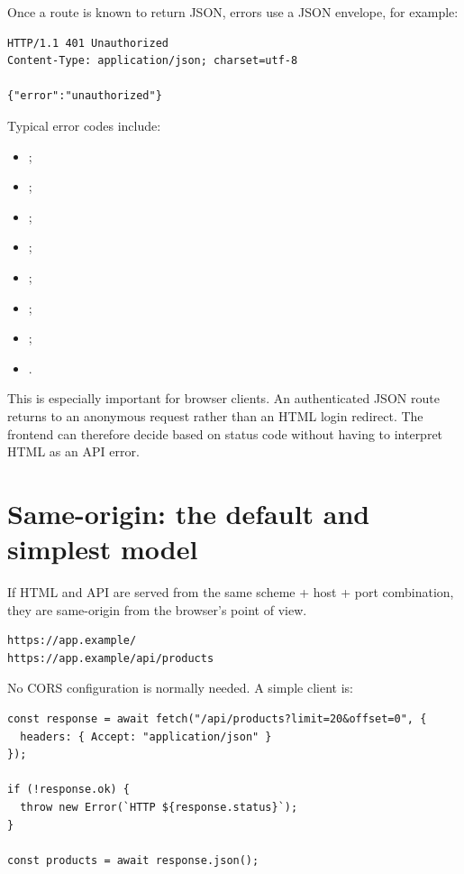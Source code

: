 Once a route is known to return JSON, errors use a JSON envelope, for example:

\begin{lstlisting}
HTTP/1.1 401 Unauthorized
Content-Type: application/json; charset=utf-8

{"error":"unauthorized"}
\end{lstlisting}

Typical error codes include:

\begin{itemize}
  \item {};
  \item {};
  \item {};
  \item {};
  \item {};
  \item {};
  \item {};
  \item {}.
\end{itemize}

This is especially important for browser clients. An authenticated JSON route returns  to an anonymous request rather than an HTML login redirect. The frontend can therefore decide based on status code without having to interpret HTML as an API error.

\section{Same-origin: the default and simplest model}

If HTML and API are served from the same scheme + host + port combination, they are same-origin from the browser's point of view.

\begin{lstlisting}
https://app.example/
https://app.example/api/products
\end{lstlisting}

No CORS configuration is normally needed. A simple client is:

\begin{lstlisting}
const response = await fetch("/api/products?limit=20&offset=0", {
  headers: { Accept: "application/json" }
});

if (!response.ok) {
  throw new Error(`HTTP ${response.status}`);
}

const products = await response.json();
\end{lstlisting}

